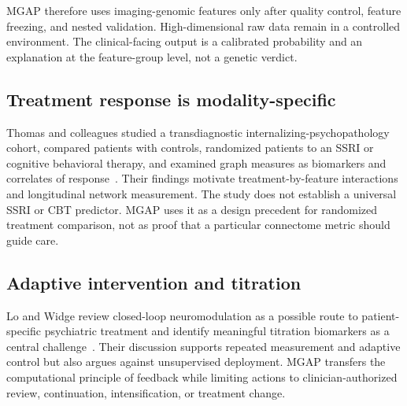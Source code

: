 \documentclass[conference]{IEEEtran}
\begin{document}
MGAP therefore uses imaging-genomic features only after quality control, feature freezing, and nested validation. High-dimensional raw data remain in a controlled environment. The clinical-facing output is a calibrated probability and an explanation at the feature-group level, not a genetic verdict.

\subsection{Treatment response is modality-specific}
Thomas and colleagues studied a transdiagnostic internalizing-psychopathology cohort, compared patients with controls, randomized patients to an SSRI or cognitive behavioral therapy, and examined graph measures as biomarkers and correlates of response~\cite{thomas2020}. Their findings motivate treatment-by-feature interactions and longitudinal network measurement. The study does not establish a universal SSRI or CBT predictor. MGAP uses it as a design precedent for randomized treatment comparison, not as proof that a particular connectome metric should guide care.

\subsection{Adaptive intervention and titration}
Lo and Widge review closed-loop neuromodulation as a possible route to patient-specific psychiatric treatment and identify meaningful titration biomarkers as a central challenge~\cite{lo2017}. Their discussion supports repeated measurement and adaptive control but also argues against unsupervised deployment. MGAP transfers the computational principle of feedback while limiting actions to clinician-authorized review, continuation, intensification, or treatment change.
\end{document}
